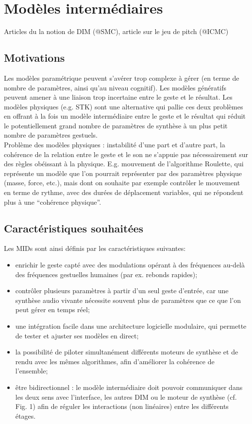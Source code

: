 \section{Modèles intermédiaires}
\label{sec:algorithms:MID}
Articles du la notion de DIM (@SMC), article sur le jeu de pitch (@ICMC)

\subsection{Motivations}

\noindent Les modèles paramétrique peuvent s'avérer trop complexe à gérer (en terme de nombre de paramètres, ainsi qu'au niveau cognitif). Les modèles génératifs peuvent amener à une liaison trop incertaine entre le geste et le résultat. Les modèles physiques (e.g. \gls{STK}) sont une alternative qui pallie ces deux problèmes en offrant à la fois un modèle intermédiaire entre le geste et le résultat qui réduit le potentiellement grand nombre de paramètres de synthèse à un plus petit nombre de paramètres gestuels.\\
\indent Problème des modèles physiques : instabilité d'une part et d'autre part, la cohérence de la relation entre le geste et le son ne s'appuie pas nécessairement sur des règles obéissant à la physique. 
E.g. mouvement de l'algorithme Roulette, qui représente un modèle que l'on pourrait représenter par des paramètres physique (masse, force, etc.), mais dont on souhaite par exemple contrôler le mouvement en terme de rythme, avec des durées de déplacement variables, qui ne répondent plus à une ``cohérence physique''.

\subsection{Caractéristiques souhaitées}

\noindent Les MIDs sont ainsi définis par les caractéristiques suivantes:
\vspace{-1em}
\begin{itemize}[noitemsep]
	\item enrichir le geste capté avec des modulations opérant à des fréquences au-delà des fréquences gestuelles humaines (par ex. rebonds rapides);
	\item contrôler plusieurs paramètres à partir d'un seul geste d'entrée, car une synthèse audio vivante nécessite souvent plus de paramètres que ce que l'on peut gérer en temps réel;
	\item une intégration facile dans une architecture logicielle modulaire, qui permette de tester et ajuster ses modèles en direct;
	\item la possibilité de piloter simultanément différents moteurs de synthèse et de rendu avec les mêmes algorithmes, afin d'améliorer la cohérence de l'ensemble;
	\item être bidirectionnel : le modèle intermédiaire doit pouvoir communiquer dans les deux sens avec l'interface, les autres DIM ou le moteur de synthèse (cf. Fig. 1) afin de réguler les interactions (non linéaires) entre les différents étages.
\end{itemize}

